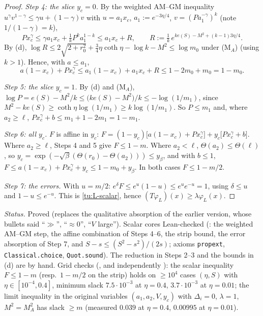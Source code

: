\begin{proof}
\emph{Step 4: the slice $y_c=0$.} By the weighted AM--GM inequality $u^\gamma v^{1-\gamma}\le\gamma u+(1-\gamma)v$ with
$u=a_1x_c$, $a_1:=e^{-3\eta/4}$, $v=(Pa_1^{-\gamma})^{k}$ (note $1/(1-\gamma)=k$),
\[
Px_c^\gamma\le\gamma a_1x_c+\tfrac1kP^ka_1^{1-k}\le a_1x_c+R,\qquad R:=\tfrac1k\,e^{ke(S)-M^2+(k-1)3\eta/4}.
\]
By (d), $\log R\le2\sqrt{2+r_0^2}+\tfrac34\eta\coth\eta-\log k-M^2\le\log m_0$ under (M$_A$) (using $k>1$). Hence, with $a\le a_1$,
\[
a(1-x_c)+Px_c^\gamma\le a_1(1-x_c)+a_1x_c+R\le1-2m_0+m_0=1-m_0 .
\]

\emph{Step 5: the slice $y_c=1$.} By (d) and (M$_A$), $\log P=e(S)-M^2/k\le\big(ke(S)-M^2\big)/k\le-\log(1/m_1)$, since
$M^2-ke(S)\ge\coth\eta\log(1/m_1)\ge k\log(1/m_1)$. So $P\le m_1$ and, where $a_2\ge\ell$,
$Px_c^\gamma+b\le m_1+1-2m_1=1-m_1$.

\emph{Step 6: all $y_c$.} $F$ is affine in $y_c$: $F=(1-y_c)\big[a(1-x_c)+Px_c^\gamma\big]+y_c\big[Px_c^\gamma+b\big]$.
Where $a_2\ge\ell$, Steps 4 and 5 give $F\le1-m$. Where $a_2<\ell$, $\Theta(a_2)\le\Theta(\ell)$, so
$y_c=\exp(-\sqrt\beta(\Theta(r_0)-\Theta(a_2)))\le y_\beta$, and with $b\le1$,
$F\le a(1-x_c)+Px_c^\gamma+y_c\le1-m_0+y_\beta$. In both cases $F\le1-m/2$.

\emph{Step 7: the errors.} With $u=m/2$: $e^\delta F\le e^{u}(1-u)\le e^ue^{-u}=1$, using $\delta\le u$ and $1-u\le e^{-u}$.
This is \eqref{tu:L-scalar}, hence $(T\varphi_L)(x)\ge\lambda\varphi_L(x)$.
\end{proof}

\noindent\emph{Status.} Proved (replaces the qualitative absorption of the earlier version, whose bullets said ``$\gg$'',
``$\approx0$'', ``$V$ large''). Scalar cores Lean-checked (: the weighted AM--GM step, the affine
combination of Steps 4--6, the strip bound, the error absorption of Step 7, and $S-s\le(S^2-s^2)/(2s)$; axioms
\texttt{propext}, \texttt{Classical.choice}, \texttt{Quot.sound}). The reduction in Steps 2--3 and the bounds in (d) are
by hand. Grid checks (, and independently ): the scalar inequality $F\le1-m$
(resp.\ $1-m/2$ on the strip) holds on $\ge10^4$ cases $(\eta,S)$ with $\eta\in[10^{-4},0.4]$, minimum slack $7.5\cdot10^{-3}$ at
$\eta=0.4$, $3.7\cdot10^{-3}$ at $\eta=0.01$; the limit inequality in the original variables $(a_1,a_2,V,y_c)$ with
$\Delta_i=0$, $\lambda=1$, $M^2=M_A^2$ has slack $\ge m$ (measured $0.039$ at $\eta=0.4$, $0.00995$ at $\eta=0.01$).

